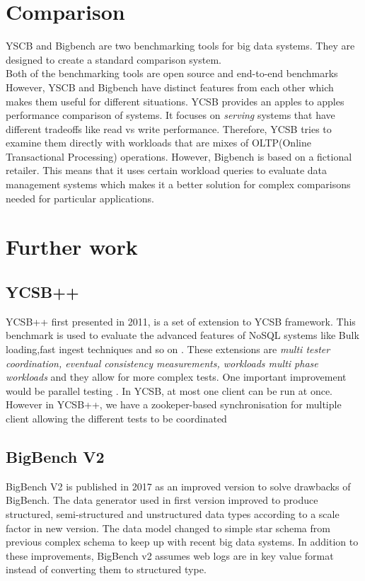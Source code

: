 \documentclass[sigconf,10pt]{acmart}
\begin{document}
\section{Comparison}
YSCB and Bigbench are two benchmarking tools for big data systems. They are designed to create a standard comparison system.
\newline \hfill\\
Both of the benchmarking tools are open source and end-to-end benchmarks
\newline \hfill\\
However, YSCB and Bigbench have distinct features from each other which makes them useful for different situations. YCSB provides an apples to apples performance comparison of systems. It focuses on \emph{serving} systems that have different tradeoffs like read vs write performance. Therefore, YCSB tries to examine them directly with workloads that are mixes of OLTP(Online Transactional Processing) operations.
However, Bigbench is based on a fictional retailer. This means that it uses certain workload queries to evaluate data management systems which makes it a better solution for complex comparisons needed for particular applications. \newline

\section{Further work}
\subsection{YCSB++}
YCSB++ first presented in 2011, is a set of extension to YCSB framework. This benchmark is used to evaluate the advanced features of NoSQL systems like Bulk loading,fast ingest techniques and so on . These extensions are  \emph{multi tester coordination, eventual consistency  measurements, workloads multi phase workloads}  and they allow for more complex tests. One  important improvement would be parallel testing . In YCSB, at most one client can be run at once. However in YCSB++, we have a zookeper-based synchronisation for multiple client allowing the different tests to be coordinated

\subsection{BigBench V2}
BigBench V2 is published in 2017 as an improved version to solve drawbacks of BigBench. The data generator used in first version improved to produce structured, semi-structured and unstructured data types according to a scale factor in new version. The data model changed to simple star schema from previous complex schema to keep up with recent big data systems. 
In addition to these improvements, BigBench v2 assumes web logs are in key value format instead of converting them to structured type. 
\end{document}

